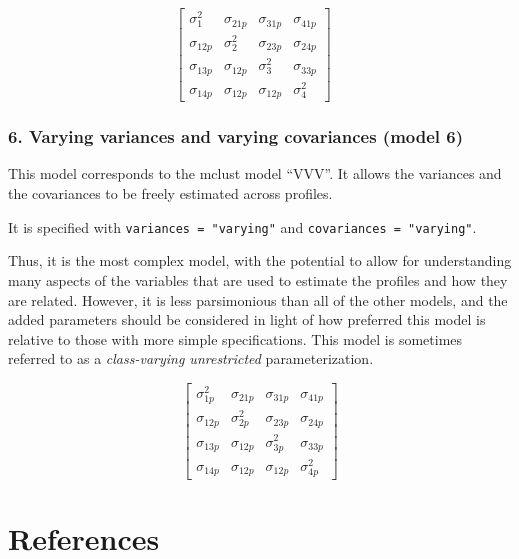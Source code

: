 \documentclass[english,man]{apa6}
\begin{document}
\[
\left[ \begin{matrix} { \sigma  }_{ 1 }^{ 2 } & { \sigma  }_{ 21p } & { \sigma  }_{ 31p } & { \sigma  }_{ 41p } \\ { \sigma  }_{ 12p } & { \sigma  }_{ 2 }^{ 2 } & { \sigma  }_{ 23p } & { \sigma  }_{ 24p } \\ { \sigma  }_{ 13p } & { \sigma  }_{ 12p } & { \sigma  }_{ 3 }^{ 2 } & { \sigma  }_{ 33p } \\ { \sigma  }_{ 14p } & { \sigma  }_{ 12p } & { \sigma  }_{ 12p } & { \sigma  }_{ 4 }^{ 2 } \end{matrix} \right] \quad 
\]

\hypertarget{varying-variances-and-varying-covariances-model-6}{%
\subsubsection{6. Varying variances and varying covariances (model 6)}\label{varying-variances-and-varying-covariances-model-6}}

This model corresponds to the mclust model \enquote{VVV}. It allows the variances and the covariances to be freely estimated across profiles.

It is specified with \texttt{variances\ =\ "varying"} and \texttt{covariances\ =\ "varying"}.

Thus, it is the most complex model, with the potential to allow for understanding many aspects of the variables that are used to estimate the profiles and how they are related. However, it is less parsimonious than all of the other models, and the added parameters should be considered in light of how preferred this model is relative to those with more simple specifications. This model is sometimes referred to as a \emph{class-varying unrestricted} parameterization.

\[
\left[ \begin{matrix} { \sigma  }_{ 1p }^{ 2 } & { \sigma  }_{ 21p } & { \sigma  }_{ 31p } & { \sigma  }_{ 41p } \\ { \sigma  }_{ 12p } & { \sigma  }_{ 2p }^{ 2 } & { \sigma  }_{ 23p } & { \sigma  }_{ 24p } \\ { \sigma  }_{ 13p } & { \sigma  }_{ 12p } & { \sigma  }_{ 3p }^{ 2 } & { \sigma  }_{ 33p } \\ { \sigma  }_{ 14p } & { \sigma  }_{ 12p } & { \sigma  }_{ 12p } & { \sigma  }_{ 4p }^{ 2 } \end{matrix} \right] 
\]

\hypertarget{references}{%
\section{References}\label{references}}
\end{document}
